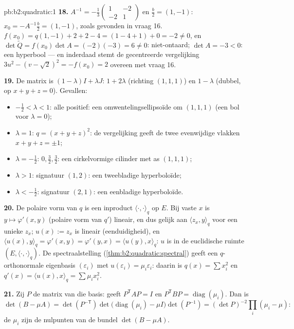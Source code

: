 \begin{solution}{pb:b2:quadratic:1}
\textbf{18.} $A^{-1} = -\frac13\begin{pmatrix} 1 & -2\\ -2 &
1\end{pmatrix}$ en $\frac b2 = (1, -1)$: $x_0 =
-A^{-1}\frac b2 = (1, -1)$, zoals gevonden in vraag 16. $f(x_0) =
q(1,-1) + 2 + 2 - 4 = (1 - 4 + 1) + 0 = -2 \neq 0$, en
$\det\widetilde Q = f(x_0)\det A = (-2)(-3) = 6 \neq 0$:
niet-ontaard; $\det A = -3 < 0$: een hyperbool --- en inderdaad
stemt de gecentreerde vergelijking $3u^2 - (v - \sqrt2)^2 =
-f(x_0) = 2$ overeen met vraag 16.

\textbf{19.} De matrix is $(1-\lambda)I + \lambda J$:
 $1 + 2\lambda$ (richting $(1,1,1)$) en $1 -
\lambda$ (dubbel, op $x + y + z = 0$). Gevallen:
\begin{itemize}
  \item $-\frac12 < \lambda < 1$: alle  positief:
        een omwentelingsellipsoïde om $(1,1,1)$ (een bol voor
        $\lambda = 0$);
  \item $\lambda = 1$: $q = (x+y+z)^2$: de vergelijking geeft de
        twee evenwijdige vlakken $x + y + z = \pm1$;
  \item $\lambda = -\frac12$:  $0, \frac32,
        \frac32$: een cirkelvormige cilinder met as $(1,1,1)$;
  \item $\lambda > 1$: signatuur $(1, 2)$: een tweebladige
        hyperboloïde;
  \item $\lambda < -\frac12$: signatuur $(2, 1)$: een
        eenbladige hyperboloïde.
\end{itemize}

\textbf{20.} De polaire vorm van $q$ is een inproduct
$\langle\cdot,\cdot\rangle_q$ op $E$. Bij vaste $x$ is $y \mapsto
\varphi'(x, y)$ (polaire vorm van $q'$) lineair, en dus gelijk aan
$\langle z_x, y\rangle_q$ voor een unieke $z_x$; $u(x) := z_x$ is
lineair (eenduidigheid), en $\langle u(x), y\rangle_q =
\varphi'(x,y) = \varphi'(y,x) = \langle u(y), x\rangle_q$: $u$ is
 in de euclidische ruimte $(E,
\langle\cdot,\cdot\rangle_q)$. De spectraalstelling
(\cref{thm:b2:quadratic:spectral}) geeft een $q$-orthonormale
eigenbasis $(\varepsilon_i)$ met $u(\varepsilon_i) =
\mu_i\varepsilon_i$: daarin is $q(x) = \sum x_i^2$ en $q'(x) =
\langle u(x), x\rangle_q = \sum\mu_ix_i^2$.

\textbf{21.} Zij $P$ de matrix van die basis:  geeft
$P^{\mathsf T}AP = I$ en $P^{\mathsf T}BP =
\operatorname{diag}(\mu_i)$. Dan is
\[
\det(B - \mu A) = \det(P^{-\mathsf T})
\det\bigl(\operatorname{diag}(\mu_i) - \mu I\bigr)
\det(P^{-1})
= (\det P)^{-2}\prod_i(\mu_i - \mu) :
\]
de $\mu_i$ zijn de nulpunten van de bundel $\det(B - \mu A)$.


\end{solution}
